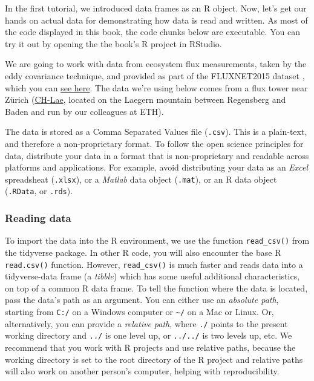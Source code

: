 \documentclass[
]{book}
\begin{document}
In the first tutorial, we introduced data frames as an R object. Now, let's get our hands on actual data for demonstrating how data is read and written. As most of the code displayed in this book, the code chunks below are executable. You can try it out by opening the the book's R project in RStudio.

We are going to work with data from ecosystem flux measurements, taken by the eddy covariance technique, and provided as part of the FLUXNET2015 dataset \citep{Pastorello2020}, which you can \href{https://www.nature.com/articles/s41597-020-0534-3}{see here}. The data we're using below comes from a flux tower near Zürich (\href{https://gl.ethz.ch/research/bage/fluxnet-ch.html}{CH-Lae}, located on the Laegern mountain between Regensberg and Baden and run by our colleagues at ETH).

The data is stored as a Comma Separated Values file (\texttt{.csv}). This is a plain-text, and therefore a non-proprietary format. To follow the open science principles for data, distribute your data in a format that is non-proprietary and readable across platforms and applications. For example, avoid distributing your data as an \emph{Excel} spreadsheat (\texttt{.xlsx}), or a \emph{Matlab} data object (\texttt{.mat}), or an R data object (\texttt{.RData}, or \texttt{.rds}).

\hypertarget{reading-data}{%
\subsubsection{Reading data}\label{reading-data}}

To import the data into the R environment, we use the function \texttt{read\_csv()} from the tidyverse package. In other R code, you will also encounter the base R \texttt{read.csv()} function. However, \texttt{read\_csv()} is much faster and reads data into a tidyverse-data frame (a \emph{tibble}) which has some useful additional characteristics, on top of a common R data frame. To tell the function where the data is located, pass the data's path as an argument. You can either use an \emph{absolute path}, starting from \texttt{C:/} on a Windows computer or \texttt{\textasciitilde{}/} on a Mac or Linux. Or, alternatively, you can provide a \emph{relative path}, where \texttt{./} points to the present working directory and \texttt{../} is one level up, or \texttt{../../} is two levels up, etc. We recommend that you work with R projects and use relative paths, because the working directory is set to the root directory of the R project and relative paths will also work on another person's computer, helping with reproducibility.
\end{document}
